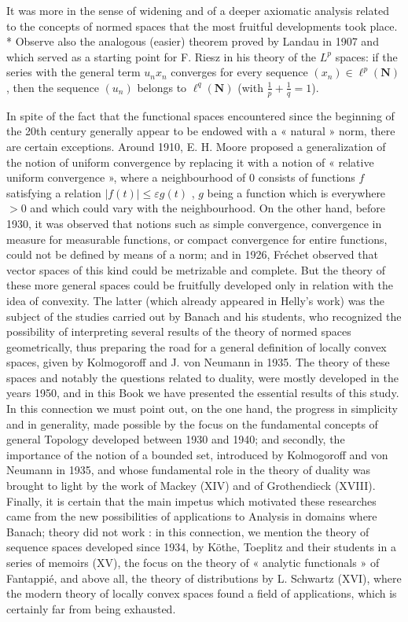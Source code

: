 It was more in the sense of widening and of a deeper axiomatic analysis related to the concepts of normed spaces that the most fruitful developments took place.
* Observe also the analogous (easier) theorem proved by Landau in 1907 and which served as a starting point for F. Riesz in his theory of the \(L^p\) spaces: if the series with the general term \(u_n x_n\) converges for every sequence \((x_n)\in \ell^p(\mathbf N)\), then the sequence \((u_n)\) belongs to \(\ell^q(\mathbf N)\) (with \(\frac{1}{p}+\frac{1}{q}=1\)).







In spite of the fact that the functional spaces encountered since the beginning of the 20th century generally appear to be endowed with a « natural » norm, there are certain exceptions. Around 1910, E. H. Moore proposed a generalization of the notion of uniform convergence by replacing it with a notion of « relative uniform convergence », where a neighbourhood of 0 consists of functions \(f\) satisfying a relation \(|f(t)| \leqslant \varepsilon g(t)\) , \(g\) being a function which is everywhere \(>0\) and which could vary with the neighbourhood. On the other hand, before 1930, it was observed that notions such as simple convergence, convergence in measure for measurable functions, or compact convergence for entire functions, could not be defined by means of a norm; and in 1926, Fréchet observed that vector spaces of this kind could be metrizable and complete. But the theory of these more general spaces could be fruitfully developed only in relation with the idea of convexity. The latter (which already appeared in Helly's work) was the subject of the studies carried out by Banach and his students, who recognized the possibility of interpreting several results of the theory of normed spaces geometrically, thus preparing the road for a general definition of locally convex spaces, given by Kolmogoroff and J. von Neumann in 1935. The theory of these spaces and notably the questions related to duality, were mostly developed in the years 1950, and in this Book we have presented the essential results of this study. In this connection we must point out, on the one hand, the progress in simplicity and in generality, made possible by the focus on the fundamental concepts of general Topology developed between 1930 and 1940; and secondly, the importance of the notion of a bounded set, introduced by Kolmogoroff and von Neumann in 1935, and whose fundamental role in the theory of duality was brought to light by the work of Mackey (XIV) and of Grothendieck (XVIII). Finally, it is certain that the main impetus which motivated these researches came from the new possibilities of applications to Analysis in domains where Banach; theory did not work : in this connection, we mention the theory of sequence spaces developed since 1934, by Köthe, Toeplitz and their students in a series of memoirs (XV), the focus on the theory of « analytic functionals » of Fantappié, and above all, the theory of distributions by L. Schwartz (XVI), where the modern theory of locally convex spaces found a field of applications, which is certainly far from being exhausted.

